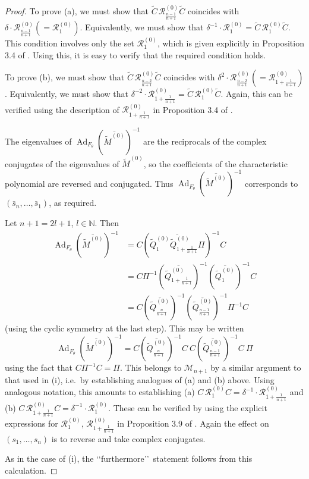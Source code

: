 \documentclass[a4paper,12pt,leqno]{amsart}
\numberwithin{equation}{section}
\theoremstyle{plain}
\theoremstyle{definition}
\newcommand{\N}{\mathbb N}
\newcommand{\de}{\delta}
\renewcommand{\th}{\theta}
\DeclareMathOperator{\Ad}{Ad}
\newcommand{\cR}{\mathcal{R}}
\newcommand{\cM}{\mathcal{M}}
\renewcommand{\ll}{\lq\lq}
\newcommand{\rr}{\rq\rq\ }
\newcommand{\tQz}{  \tilde Q^{(0)}  }
\newcommand{\tMz}{  \tilde M^{(0)}  }
\newcommand{\tC}{  \tilde C }
\newcommand{\cRz}{ \cR^{(0)}}
\begin{document}
\begin{proof}
To prove (a), we must show that
$\tC \, \cRz_{{\scriptstyle\frac{n-1}{n+1}} } \tC$ coincides
with $\de\cdot \cRz_{{\scriptstyle\frac{n-1}{n+1}} } (=  \cRz_{1})$.
Equivalently, we must show that
$\de^{-1}\cdot \cRz_{1} = \tC \, \cRz_{1} \tC$.
This condition involves only the set $\cRz_{1}$, which is given explicitly in Proposition 3.4 of \cite{GH1}.  Using this, it is easy to verify that the required condition holds.

To prove (b), we must show that
$\tC \, \cRz_{{\scriptstyle\frac{n-2}{n+1}} } \tC$ coincides
with $\de^2\cdot \cRz_{{\scriptstyle\frac{n-2}{n+1}} } (=  \cRz_{1+{\scriptstyle\frac{1}{n+1}}})$.
Equivalently, we must show that
$\de^{-2}\cdot \cRz_{1+{\scriptstyle\frac{1}{n+1}}}
= \tC \, \cRz_{1} \tC$. Again, this can be verified using the description of $\cRz_{1+{\scriptstyle\frac{1}{n+1}}}$
in Proposition 3.4 of \cite{GH1}.

The eigenvalues of $\Ad_{F_\th} (\overline{\tMz  })^{-1}$ are the reciprocals of the complex conjugates
of the eigenvalues of $\tMz$, so the coefficients of the characteristic polynomial are reversed and conjugated. Thus $\Ad_{F_\th} (\overline{\tMz  })^{-1}$
corresponds to $(\bar s_n,\dots,\bar s_1)$, as required.

Let $n+1=2l+1$, $l\in\N$. Then
\begin{align*}
\Ad_{F_\th} (\overline{\tMz  })^{-1}
&=
C(\overline{\tQz_1\tQz_{1+ {\scriptstyle\frac{1}{n+1}}  }\Pi}  )^{-1} C
\\
&=
C \Pi^{-1}
(\overline{\tQz_{1+ {\scriptstyle\frac{1}{n+1}} } })^{-1}
(\overline{\tQz_1 })^{-1} C
\\
&=
C
(\overline{\tQz_{{\scriptstyle\frac{n}{n+1}} } })^{-1}
(\overline{\tQz_{{\scriptstyle\frac{n-1}{n+1}} } })^{-1} \Pi^{-1}C
\end{align*}
(using the cyclic symmetry at the last step).  This may be written
\[
\Ad_{F_\th} (\overline{\tMz  })^{-1}=
C (\overline{\tQz_{{\scriptstyle\frac{n}{n+1}} } })^{-1}C
\
C(\overline{\tQz_{{\scriptstyle\frac{n-1}{n+1}} } })^{-1}C
\
\Pi
\]
using the fact that $C \Pi^{-1}C=\Pi$.  This belongs to $\cM_{n+1}$ by a similar argument
to that used in (i), i.e.\ by establishing analogues of (a) and (b) above.
Using analogous notation, this amounts to establishing
(a) $C \, \cRz_{1} C = \de^{-1}\cdot \cRz_{1+ {\scriptstyle\frac{1}{n+1}} }$
and
(b) $C \, \cRz_{1+ {\scriptstyle\frac{1}{n+1}} } C=
\de^{-1}\cdot \cRz_{1}$.
These can be verified by using the explicit expressions for
$\cRz_{1}$, $\cRz_{1+ {\scriptstyle\frac{1}{n+1}} }$
in Proposition 3.9 of \cite{GH1}.
Again the effect on  $(s_1,\dots,s_n)$ is
to reverse and take complex conjugates.

As in the case of (i), the \ll furthermore\rr statement follows from this calculation.
\end{proof}
\end{document}
